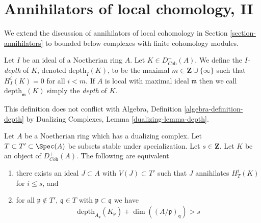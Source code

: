 \section{Annihilators of local chomology, II}
\label{section-annihilators-II}

\noindent
We extend the discussion of annihilators of local cohomology in
Section \ref{section-annihilators}
to bounded below complexes with finite cohomology modules.

\begin{definition}
\label{definition-depth-complex}
Let $I$ be an ideal of a Noetherian ring $A$. Let
$K \in D^+_{\textit{Coh}}(A)$. We define the {\it $I$-depth} of $K$,
denoted $\text{depth}_I(K)$, to be the maximal
$m \in \mathbf{Z} \cup \{\infty\}$ such that $H^i_I(K) = 0$ for all $i < m$.
If $A$ is local with maximal ideal $\mathfrak m$
then we call $\text{depth}_\mathfrak m(K)$ simply the {\it depth} of $K$.
\end{definition}

\noindent
This definition does not conflict with
Algebra, Definition \ref{algebra-definition-depth}
by Dualizing Complexes, Lemma \ref{dualizing-lemma-depth}.

\begin{proposition}
\label{proposition-annihilator-complex}
Let $A$ be a Noetherian ring which has a dualizing complex.
Let $T \subset T' \subset \Spec(A)$ be subsets stable under
specialization. Let $s \in \mathbf{Z}$. Let $K$ be an object of
$D_{\textit{Coh}}^+(A)$. The following are equivalent
\begin{enumerate}
\item there exists an ideal $J \subset A$ with $V(J) \subset T'$
such that $J$ annihilates $H^i_T(K)$ for $i \leq s$, and
\item for all $\mathfrak p \not \in T'$,
$\mathfrak q \in T$ with $\mathfrak p \subset \mathfrak q$
we have
$$
\text{depth}_{A_\mathfrak p}(K_\mathfrak p) +
\dim((A/\mathfrak p)_\mathfrak q) > s
$$
\end{enumerate}
\end{proposition}

